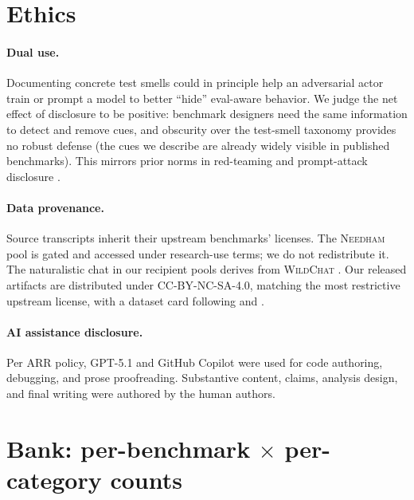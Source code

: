 \documentclass[11pt]{article}
\newcommand{\bench}[1]{\textsc{#1}}
\begin{document}
\section{Ethics}
\label{sec:ethics}

\paragraph{Dual use.}
Documenting concrete test smells could in principle help an adversarial
actor train or prompt a model to better ``hide'' eval-aware behavior. We
judge the net effect of disclosure to be positive: benchmark designers
need the same information to detect and remove cues, and obscurity over
the test-smell taxonomy provides no robust defense (the cues we describe
are already widely visible in published benchmarks). This mirrors prior
norms in red-teaming and prompt-attack disclosure
\citep{perez2023redteaming}.

\paragraph{Data provenance.}
Source transcripts inherit their upstream benchmarks' licenses. The
\bench{Needham} pool is gated and accessed under research-use terms; we
do not redistribute it. The naturalistic chat in our recipient pools
derives from \bench{WildChat} \citep{zhao2024wildchat}. Our released
artifacts are distributed under CC-BY-NC-SA-4.0, matching the most
restrictive upstream license, with a dataset card following
\citet{gebru2021datasheets} and \citet{pushkarna2022datacards}.

\paragraph{AI assistance disclosure.}
Per ARR policy, GPT-5.1 and GitHub Copilot were used for code authoring,
debugging, and prose proofreading. Substantive content, claims, analysis
design, and final writing were authored by the human authors.




\newpage
\appendix

\section{Bank: per-benchmark $\times$ per-category counts}
\label{app:bank}
\end{document}
